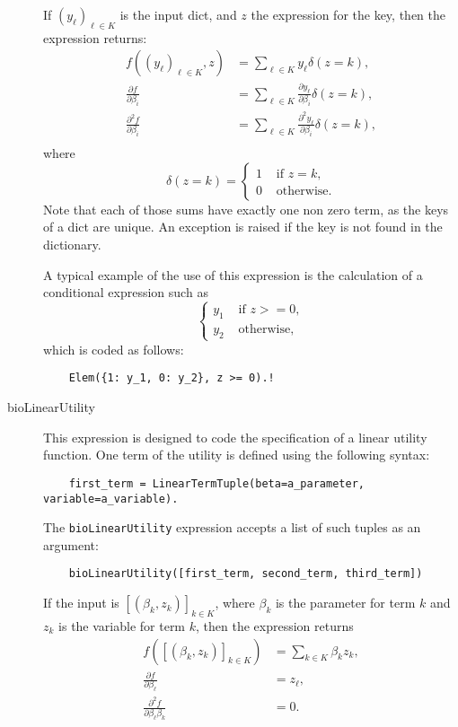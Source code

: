 \documentclass[12pt,a4paper]{article}
\begin{document}
\begin{description}
\begin{lstlisting}
  \end{lstlisting}
  If $(y_\ell)_{\ell\in K}$ is the input dict, and $z$ the expression for the key, then the expression returns:
  \begin{align*}
f((y_\ell)_{\ell\in K}, z) &= \sum_{\ell \in K} y_\ell \delta(z = k), \\
\frac{\partial f}{\partial \beta_i} &= \sum_{\ell \in K} \frac{\partial y_\ell}{\partial \beta_i} \delta(z = k), \\
\frac{\partial^2 f}{\partial \beta_i} &= \sum_{\ell \in K} \frac{\partial^2 y_\ell}{\partial \beta_i} \delta(z = k), \\
  \end{align*}
    where
  \[
  \delta(z=k) = \left\{
  \begin{aligned}
    1 & \text{ if } z = k, \\
    0 & \text{ otherwise.}
  \end{aligned}
  \right.
  \]
  Note that each of those sums have exactly one non zero term, as the
  keys of a dict are unique. An exception is raised if the key is not found in the dictionary.

  A typical example of the use of this expression is the calculation of a conditional expression such as
  \[
     \left\{
  \begin{aligned}
    y_1 & \text{ if } z >= 0, \\
    y_2 & \text{ otherwise},
  \end{aligned}
  \right.
  \]
  which is coded as follows:
  \begin{lstlisting}
    Elem({1: y_1, 0: y_2}, z >= 0).!
  \end{lstlisting}

\item[bioLinearUtility] This expression is designed to code the specification of a linear utility function.  One term of the utility is defined using the following syntax:
  \begin{lstlisting}
    first_term = LinearTermTuple(beta=a_parameter, variable=a_variable).
  \end{lstlisting}
  The \lstinline+bioLinearUtility+ expression accepts a list of such tuples as an argument:
  \begin{lstlisting}
    bioLinearUtility([first_term, second_term, third_term])
  \end{lstlisting}
  If the input is $[(\beta_k, z_k)]_{k\in K}$, where $\beta_k$ is the parameter for term $k$ and $z_k$ is the variable for term $k$,  then the expression returns
  \begin{align*}
  f([(\beta_k, z_k)]_{k\in K}) &= \sum_{k\in K} \beta_k z_k, \\
  \frac{\partial f}{\partial \beta_\ell} &= z_\ell, \\ 
  \frac{\partial^2 f}{\partial \beta_\ell \beta_k} &= 0. \\ 
  \end{align*}

  
\end{description}
\end{document}
